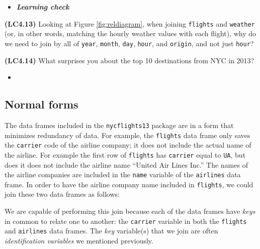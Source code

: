 \documentclass[12pt, krantz2,]{krantz}
\makeatletter
\newenvironment{Shaded}{\begin{snugshade}}{\end{snugshade}}
\newcommand{\DataTypeTok}[1]{\textcolor[rgb]{0.27,0.27,0.27}{#1}}
\newcommand{\KeywordTok}[1]{\textcolor[rgb]{0.27,0.27,0.27}{\textbf{#1}}}
\newcommand{\NormalTok}[1]{#1}
\newcommand{\OperatorTok}[1]{\textcolor[rgb]{0.43,0.43,0.43}{\textbf{#1}}}
\newcommand{\StringTok}[1]{\textcolor[rgb]{0.5,0.5,0.5}{#1}}
\newenvironment{kframe}{%
\medskip{}
\setlength{\fboxsep}{.8em}
 \def\at@end@of@kframe{}%
 \ifinner\ifhmode%
  \def\at@end@of@kframe{\end{minipage}}%
  \begin{minipage}{\columnwidth}%
 \fi\fi%
 \def\FrameCommand##1{\hskip\@totalleftmargin \hskip-\fboxsep
 \colorbox{shadecolor}{##1}\hskip-\fboxsep
     \hskip-\linewidth \hskip-\@totalleftmargin \hskip\columnwidth}%
 \MakeFramed {\advance\hsize-\width
   \@totalleftmargin\z@ \linewidth\hsize
   \@setminipage}}%
 {\par\unskip\endMakeFramed%
 \at@end@of@kframe}
\renewenvironment{Shaded}{\begin{kframe}}{\end{kframe}}
\newenvironment{rmdblock}[1]
  {\begin{shaded*}
  \begin{itemize}
  \renewcommand{\labelitemi}{
    \raisebox{-.7\height}[0pt][0pt]{
    }
  }
  \item
  }
  {
  \end{itemize}
  \end{shaded*}
  }
\newenvironment{learncheck}
  {\begin{rmdblock}{warning}}
  {\end{rmdblock}}
\makeatother
\begin{document}
\begin{learncheck}
\textbf{\emph{Learning check}}
\end{learncheck}

\textbf{(LC4.13)} Looking at Figure \ref{fig:reldiagram}, when joining \texttt{flights} and \texttt{weather} (or, in other words, matching the hourly weather values with each flight), why do we need to join by all of \texttt{year}, \texttt{month}, \texttt{day}, \texttt{hour}, and \texttt{origin}, and not just \texttt{hour}?

\textbf{(LC4.14)} What surprises you about the top 10 destinations from NYC in 2013?

\begin{learncheck}

\end{learncheck}

\hypertarget{normal-forms}{%
\subsection{Normal forms}\label{normal-forms}}

The data frames included in the \texttt{nycflights13} package are in a form that minimizes redundancy of data. For example, the \texttt{flights} data frame only saves the \texttt{carrier} code of the airline company; it does not include the actual name of the airline. For example the first row of \texttt{flights} has \texttt{carrier} equal to \texttt{UA}, but does it does not include the airline name ``United Air Lines Inc.'' The names of the airline companies are included in the \texttt{name} variable of the \texttt{airlines} data frame. In order to have the airline company name included in \texttt{flights}, we could join these two data frames as follows:

\begin{Shaded}
\end{Shaded}

We are capable of performing this join because each of the data frames have \emph{keys} in common to relate one to another: the \texttt{carrier} variable in both the \texttt{flights} and \texttt{airlines} data frames. The \emph{key} variable(s) that we join are often \emph{identification variables} we mentioned previously.
\end{document}
